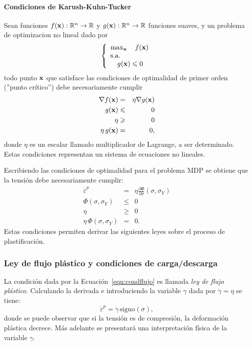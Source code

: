 \paragraph{Condiciones de Karush-Kuhn-Tucker}
Sean funciones $f({\bf x}):{\mathbb R}^n \rightarrow {\mathbb R}$ y $g({\bf x}):{\mathbb R}^n \rightarrow {\mathbb R}$ funciones suaves, y un problema de optimizacion no lineal dado por 
\begin{equation}
\left\{
\begin{array}{l}
\max_{\bf x} \quad f({\bf x})\\
\text{s.a.}\\
\quad g({\bf x}) \leqslant 0\\
\end{array}
\right.
\end{equation}
%
todo punto ${\bf x}$ que satisface las condiciones de optimalidad de primer orden (''punto crítico'') debe necesariamente cumplir
%
\begin{eqnarray}
\nabla f({\bf x}) &=& \eta \nabla g ({\bf x})\\
g({\bf x}) &\leqslant & 0 \\
\eta &\geqslant& 0\\
\eta \, g({\bf x}) &=& 0,
\end{eqnarray}
donde $\eta$ es un escalar llamado multiplicador de Lagrange, a ser determinado. %
%
Estas condiciones representan un sistema de ecuaciones no lineales. %


Escribiendo las condiciones de optimalidad para el problema MDP se obtiene que la tensión debe necesariamente cumplir:
%
\begin{eqnarray}
\dot{ \varepsilon}^p &=& \eta \frac{\partial \Phi}{\partial \sigma}(\sigma,\sigma_Y) \label{eqn:condflujo}\\
\Phi(\sigma,\sigma_Y) &\leq & 0 \\
\eta &\geq& 0 \\
\eta \, \Phi(\sigma,\sigma_Y) &=& 0.
\end{eqnarray}
%
Estas condiciones permiten derivar las siguientes leyes sobre el proceso de plastificación.

\subsubsection{Ley de flujo plástico y condiciones de carga/descarga}

La condición dada por la Ecuación~\eqref{eqn:condflujo} es llamada \textit{ley de flujo plástico}. %
%
Calculando la derivada e introduciendo la variable $\gamma$ dada por $\dot{ \gamma} = \eta$ se tiene:
%
\begin{equation}\label{eqn:dotepsgam}
\dot{ \varepsilon}^p = \dot{ \gamma} \, \text{signo}(\sigma),
\end{equation}
donde se puede observar que si la tensión es de compresión, la deformación plástica decrece. %
%
Más adelante se presentará una interpretación física de la variable $\gamma$. %


